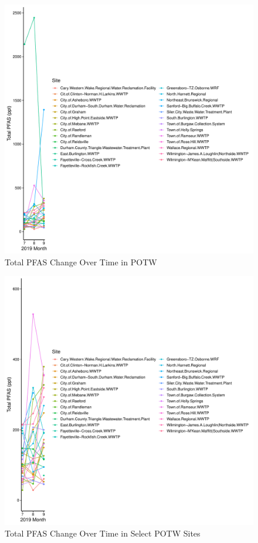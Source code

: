 \documentclass[
  12pt,
]{article}
\begin{document}
\begin{figure}

\includegraphics{PFAS_FinalProject_files/figure-latex/unnamed-chunk-24-1} \hfill{}

\caption{Total PFAS Change Over Time in POTW}\label{fig:unnamed-chunk-24}
\end{figure}

\begin{figure}

\includegraphics{PFAS_FinalProject_files/figure-latex/unnamed-chunk-25-1} \hfill{}

\caption{Total PFAS Change Over Time in Select POTW Sites}\label{fig:unnamed-chunk-25}
\end{figure}
\end{document}
